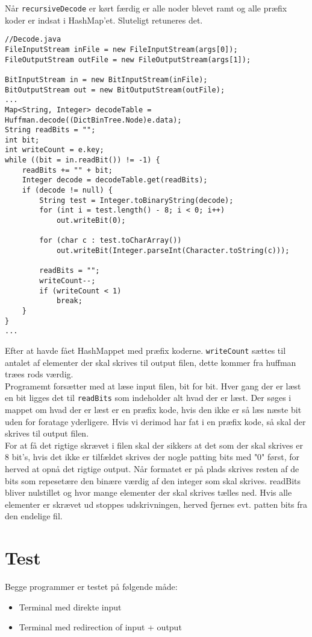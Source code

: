 \documentclass{article}
\begin{document}
Når \texttt{recursiveDecode} er kørt færdig er alle noder blevet ramt og alle præfix koder er indsat i HashMap'et. Sluteligt retuneres det.
\newpage
\begin{lstlisting}
//Decode.java
FileInputStream inFile = new FileInputStream(args[0]);
FileOutputStream outFile = new FileOutputStream(args[1]);

BitInputStream in = new BitInputStream(inFile);
BitOutputStream out = new BitOutputStream(outFile);
...
Map<String, Integer> decodeTable = Huffman.decode((DictBinTree.Node)e.data);
String readBits = "";
int bit;
int writeCount = e.key;
while ((bit = in.readBit()) != -1) {
	readBits += "" + bit;
	Integer decode = decodeTable.get(readBits);
	if (decode != null) {
		String test = Integer.toBinaryString(decode);
		for (int i = test.length() - 8; i < 0; i++) 
 			out.writeBit(0);	
 			
		for (char c : test.toCharArray())
			out.writeBit(Integer.parseInt(Character.toString(c)));

		readBits = "";
		writeCount--;
		if (writeCount < 1) 
			break;
	}
}
...
\end{lstlisting}
Efter at havde fået HashMappet med præfix koderne. \texttt{writeCount}  sættes til antalet af elementer der skal skrives til output filen, dette kommer fra huffman træes rods værdig.\\
Programemt forsætter med at læse input filen, bit for bit. Hver gang der er læst en bit ligges det til \texttt{readBits} som indeholder alt hvad der er læst.
Der søges i mappet om hvad der er læst er en præfix kode, hvis den ikke er så læs næste bit uden for foratage yderligere. Hvis vi derimod har fat i en præfix kode, så skal der skrives til output filen. \\
For at få det rigtige skrævet i filen skal der sikkers at det som der skal skrives er 8 bit's, hvis det ikke er tilfældet skrives der nogle patting bits med "0" først, for herved at opnå det rigtige output. Når formatet er på plads skrives resten af de bits som repesetære den binære værdig af den integer som skal skrives. readBits bliver nulstillet og hvor mange elementer der skal skrives tælles ned. Hvis alle elementer er skrævet ud stoppes udskrivningen, herved fjernes evt. patten bits fra den endelige fil.
\newpage
\section*{Test}
Begge programmer er testet på følgende måde:
\begin{itemize}
  \item Terminal med direkte input
  \item Terminal med redirection of input + output
\end{itemize}
\bigskip
\end{document}
